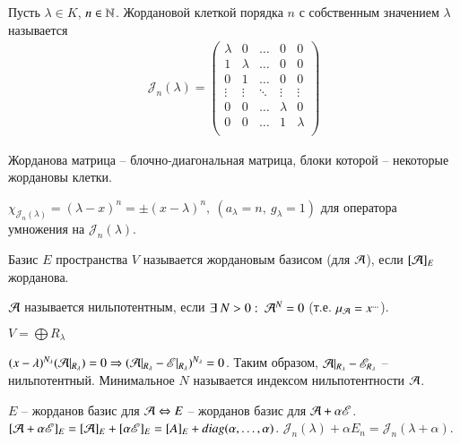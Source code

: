 \documentclass[main]{subfiles}
\begin{document}
\begin{definition} 
  Пусть  $\lambda \in K$, $n \in \mathbb{N}$. Жордановой клеткой порядка $n$ с собственным значением $\lambda$ называется
  \begin{gather*} \mathcal{J}_n(\lambda) =
    \begin{pmatrix}
      \lambda & 0       & \ldots & 0       & 0       \\
      1       & \lambda & \ldots & 0       & 0       \\
      0       & 1       & \ldots & 0       & 0       \\
      \vdots  & \vdots  & \ddots & \vdots  & \vdots  \\
      0       & 0       & \ldots & \lambda & 0       \\
      0       & 0       & \ldots & 1       & \lambda \\
    \end{pmatrix}
  \end{gather*}

  Жорданова матрица -- блочно-диагональная матрица, блоки которой -- некоторые жордановы клетки.

  $\chi_{\mathcal{J}_n(\lambda)} = (\lambda - x)^n = \pm (x - \lambda)^n, \ (a_{\lambda} = n,\ g_{\lambda} = 1)$ для оператора умножения на $\mathcal{J}_n(\lambda)$.

  Базис $E$ пространства $V$ называется жордановым базисом (для $\mathcal{A}$), если $[\mathcal{A}]_E$ жорданова.
\end{definition}

\begin{definition} 
  $\mathcal{A}$ называется нильпотентным, если $\exists \ N > 0: \ \mathcal{A}^N = 0$ (т.е. $\mu_{\mathcal{A}} = x^{...}$).
\end{definition}

$V = \bigoplus R_{\lambda}$

$(x - \lambda)^{N_{\lambda}}(\mathcal{A} |_{R_{\lambda}}) = 0 \Rightarrow (\mathcal{A} |_{R_{\lambda}} - \mathscr{E} |_{R_{\lambda}})^{N_{\lambda}} = 0$.
Таким образом, $\mathcal{A} |_{R_{\lambda}} - \mathscr{E}_{R_{\lambda}}$ -- нильпотентный. Минимальное $N$ называется индексом нильпотентности $\mathcal{A}$.

\begin{remark}
  $E$ -- жорданов базис для $\mathcal{A} \Leftrightarrow E$ -- жорданов базис для $\mathcal{A} + \alpha \mathscr{E}$.
  $[\mathcal{A} + \alpha \mathscr{E}]_E = [\mathcal{A}]_E + [\alpha \mathscr{E}]_E = [A]_E + diag(\alpha, \ldots, \alpha)$.
  $\mathcal{J}_n(\lambda) + \alpha E_n = \mathcal{J}_n(\lambda + \alpha)$.
\end{remark}
\end{document}

